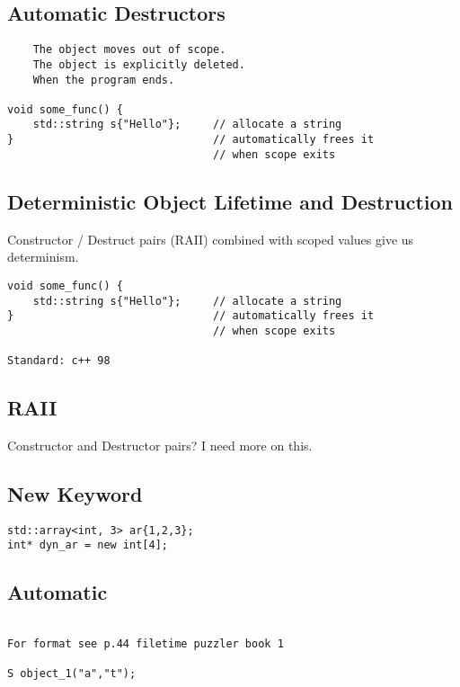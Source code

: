 \subsection{Automatic Destructors}

\begin{verbatim}
    The object moves out of scope.
    The object is explicitly deleted.
    When the program ends.

void some_func() {
    std::string s{"Hello"};     // allocate a string
}                               // automatically frees it
                                // when scope exits
\end{verbatim}

\subsection{Deterministic Object Lifetime and Destruction}

Constructor / Destruct pairs (RAII) combined with scoped values give us determinism.

\begin{verbatim}
void some_func() {
    std::string s{"Hello"};     // allocate a string
}                               // automatically frees it
                                // when scope exits

Standard: c++ 98
\end{verbatim}


\subsection{RAII}

Constructor and Destructor pairs? I need more on this.

\subsection{New Keyword}

\begin{verbatim}
std::array<int, 3> ar{1,2,3};
int* dyn_ar = new int[4];
\end{verbatim}



\subsection{Automatic}
\begin{verbatim}

For format see p.44 filetime puzzler book 1

S object_1("a","t");
\end{verbatim}

